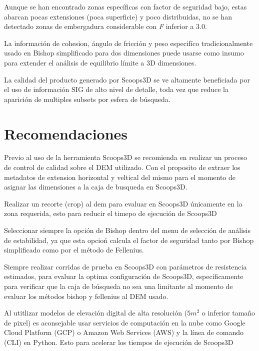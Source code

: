 Aunque se han encontrado zonas espec\'ificas con factor de seguridad bajo, estas abarcan pocas extensiones (poca superficie) y poco distribuidas, no se han detectado zonas de embergadura considerable con \textit{F} inferior a 3.0.

La informaci\'on de cohesion, \'angulo de fricci\'on y peso especif\'ico tradicionalmente usado en Bishop simplificado para dos dimensiones puede usarse como insumo para extender el an\'alisis  de equilibrio l\'imite a 3D dimensiones.

La calidad del producto generado por Scoops3D se ve altamente beneficiada por el uso de informaci\'on SIG de alto nivel de detalle, toda vez que reduce la aparici\'on de multiples subsets por esfera de b\'usqueda. 





\section{Recomendaciones}

Previo al uso de la herramienta Scoops3D se recomienda en realizar un proceso de control de calidad sobre el DEM utilizado. Con el proposito de extraer los metadatos de extension horizontal y veltical del mismo para el momento de asignar las dimensiones a la caja de busqueda en Scoops3D.

Realizar un recorte (crop) al dem para evaluar en Scoops3D \'unicamente en la zona requerida, esto para reducir el timepo de ejecuci\'on de Scoops3D

Seleccionar siempre la opci\'on de Bishop dentro del menu de selecci\'on de an\'alisis de estabilidad, ya que esta opcio\'n calcula el factor de seguridad tanto por Bishop simplificado como por el m\'etodo de Fellenius.

Siempre realizar corridas de prueba en Scoops3D con par\'ametros de resistencia estimados, para evaluar la optima configuraci\'on de Scoops3D, espec\'ificamente para verificar que la caja de b\'usqueda no sea una limitante al momento de evaluar los m\'etodos bishop y fellenius al DEM usado.

Al utitlizar modelos de elevaci\'on digital de alta resoluci\'on ($5m^{2}$ o inferior tama\~no de pixel) es aconsejable usar servicios de computaci\'on en la nube como Google Cloud Platform (GCP) o Amazon Web Services (AWS) y la l\'inea de comando (CLI) en Python. Esto para acelerar los tiempos de ejecuci\'on
de Scoops3D